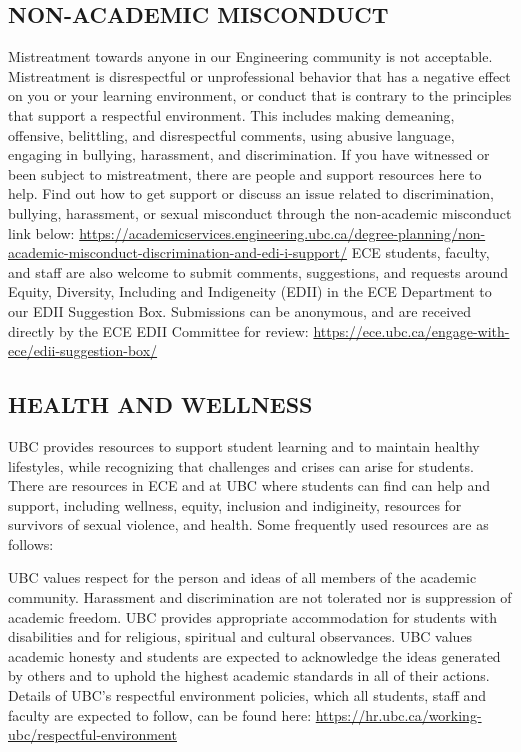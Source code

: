 \documentclass [11pt]{article}
\begin{document}
\subsection*{NON-ACADEMIC MISCONDUCT}
Mistreatment towards anyone in our Engineering community is not acceptable. Mistreatment is disrespectful or unprofessional behavior that has a negative effect on you or your learning environment, or conduct that is contrary to the principles that support a respectful environment. This includes making demeaning, offensive, belittling, and disrespectful comments, using abusive language, engaging in bullying, harassment, and discrimination. 
If you have witnessed or been subject to mistreatment, there are people and support resources here to help. Find out how to get support or discuss an issue related to discrimination, bullying, harassment, or sexual misconduct through the non-academic misconduct link below:
\url{https://academicservices.engineering.ubc.ca/degree-planning/non-academic-misconduct-discrimination-and-edi-i-support/}
ECE students, faculty, and staff are also welcome to submit comments, suggestions, and requests around Equity, Diversity, Including and Indigeneity (EDII) in the ECE Department to our EDII Suggestion Box. Submissions can be anonymous, and are received directly by the ECE EDII Committee for review: \url{https://ece.ubc.ca/engage-with-ece/edii-suggestion-box/}

\subsection*{HEALTH AND WELLNESS}
UBC provides resources to support student learning and to maintain healthy lifestyles, while recognizing that challenges and crises can arise for students. There are resources in ECE and at UBC where students can find can help and support, including wellness, equity, inclusion and indigineity, resources for survivors of sexual violence, and health. Some frequently used resources are as follows:

UBC values respect for the person and ideas of all members of the academic community. Harassment and discrimination are not tolerated nor is suppression of academic freedom. UBC provides appropriate accommodation for students with disabilities and for religious, spiritual and cultural observances. UBC values academic honesty and students are expected to acknowledge the ideas generated by others and to uphold the highest academic standards in all of their actions. Details of UBC’s respectful environment policies, which all students, staff and faculty are expected to follow, can be found here: \url{https://hr.ubc.ca/working-ubc/respectful-environment}
\end{document}
